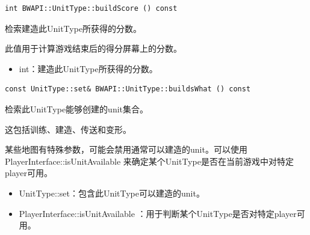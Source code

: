 \begin{tcolorbox}[colback=white, colframe=black!60!white, title=buildScore(), arc=0mm]
    \begin{verbatim}
int BWAPI::UnitType::buildScore () const
    \end{verbatim}
检索建造此UnitType所获得的分数。\par
此值用于计算游戏结束后的得分屏幕上的分数。
\begin{return}
\begin{itemize}
    \item int：建造此UnitType所获得的分数。
\end{itemize}
\end{return}
\end{tcolorbox}


\begin{tcolorbox}[colback=white, colframe=black!60!white, title=buildsWhat(), arc=0mm]
    \begin{verbatim}
const UnitType::set& BWAPI::UnitType::buildsWhat () const
    \end{verbatim}
    检索此UnitType能够创建的unit集合。\par
    这包括训练、建造、传送和变形。
\begin{note}
    某些地图有特殊参数，可能会禁用通常可以建造的unit。可以使用   PlayerInterface::isUnitAvailable   来确定某个UnitType是否在当前游戏中对特定player可用。
\end{note}
\begin{return}
\begin{itemize}
    \item UnitType::set：包含此UnitType可以建造的unit。
\end{itemize}
\end{return}
\begin{refer}
\begin{itemize}
    \item PlayerInterface::isUnitAvailable  ：用于判断某个UnitType是否对特定player可用。
\end{itemize}
\end{refer}
\end{tcolorbox}


